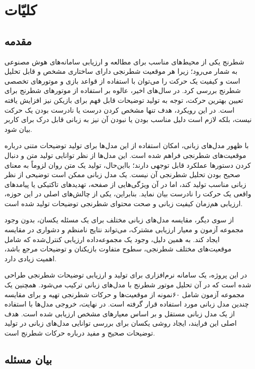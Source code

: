 \chapter{کلیّات}

\section{مقدمه}

شطرنج یکی از محیط‌های مناسب برای مطالعه و ارزیابی سامانه‌های هوش مصنوعی به شمار می‌رود؛ زیرا هر موقعیت شطرنجی دارای ساختاری مشخص و قابل تحلیل است و کیفیت یک حرکت را می‌توان با استفاده از قواعد بازی و موتورهای تخصصی شطرنج بررسی کرد. در سال‌های اخیر، عالوه بر استفاده از موتورهای شطرنج برای تعیین بهترین حرکت، توجه به تولید توضیحات قابل فهم برای بازیکن نیز افزایش یافته است. در این رویکرد، هدف تنها مشخص کردن درست یا نادرست بودن یک حرکت نیست، بلکه لازم است دلیل مناسب بودن یا نبودن آن نیز به زبانی قابل درک برای کاربر بیان شود.

با ظهور مدل‌های زبانی، امکان استفاده از این مدل‌ها برای تولید توضیحات متنی درباره موقعیت‌های شطرنجی فراهم شده است. این مدل‌ها از نظر توانایی تولید متن و دنبال کردن دستورها عملکرد قابل توجهی دارند؛ بااین‌حال، تولید یک متن روان لزوماً به معنای صحیح بودن تحلیل شطرنجی آن نیست. یک مدل زبانی ممکن است توضیحی از نظر زبانی مناسب تولید کند، اما در آن ویژگی‌هایی از صفحه، تهدیدهای تاکتیکی یا پیامدهای واقعی یک حرکت را نادرست بیان نماید. بنابراین، یکی از چالش‌های اصلی در این حوزه، ارزیابی هم‌زمان کیفیت زبانی و صحت محتوای شطرنجی توضیحات تولید شده است.

از سوی دیگر، مقایسه مدل‌های زبانی مختلف برای یک مسئله یکسان، بدون وجود مجموعه آزمون و معیار ارزیابی مشترک، می‌تواند نتایج نامنظم و دشواری در مقایسه ایجاد کند. به همین دلیل، وجود یک مجموعه‌داده ارزیابی کنترل‌شده که شامل موقعیت‌های مختلف شطرنجی، سطوح متفاوت بازیکنان و توضیحات مرجع باشد، اهمیت زیادی دارد.

در این پروژه، یک سامانه نرم‌افزاری برای تولید و ارزیابی توضیحات شطرنجی طراحی شده است که در آن تحلیل موتور شطرنج با مدل‌های زبانی ترکیب می‌شود. همچنین یک مجموعه آزمون شامل  ۶۰نمونه از موقعیت‌ها و حرکات شطرنجی تهیه و برای مقایسه چندین مدل زبانی مورد استفاده قرار گرفته است. در نهایت، خروجی مدل‌ها با استفاده از یک مدل زبانی مستقل و بر اساس معیارهای مشخص ارزیابی شده است. هدف اصلی این فرایند، ایجاد روشی یکسان برای بررسی توانایی مدل‌های زبانی در تولید توضیحات صحیح و مفید درباره حرکات شطرنج است.

\section{بیان مسئله}

